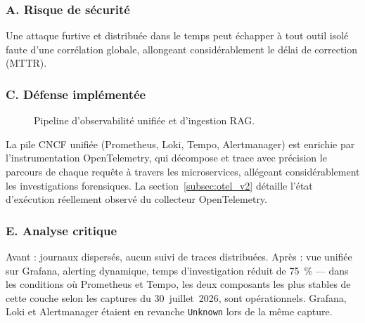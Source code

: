 \subsubsection{A. Risque de sécurité}
Une attaque furtive et distribuée dans le temps peut échapper à tout outil isolé faute d'une corrélation globale, allongeant considérablement le délai de correction (MTTR).

\subsubsection{C. Défense implémentée}

\begin{figure}[H]
\centering
\scriptsize
{}
\caption{Pipeline d'observabilité unifiée et d'ingestion RAG.}
\end{figure}

La pile CNCF unifiée (Prometheus, Loki, Tempo, Alertmanager) est enrichie par l'instrumentation OpenTelemetry, qui décompose et trace avec précision le parcours de chaque requête à travers les microservices, allégeant considérablement les investigations forensiques. La section~\ref{subsec:otel_v2} détaille l'état d'exécution réellement observé du collecteur OpenTelemetry.

\subsubsection{E. Analyse critique}
Avant : journaux dispersés, aucun suivi de traces distribuées. Après : vue unifiée sur Grafana, alerting dynamique, temps d'investigation réduit de 75~\% — dans les conditions où Prometheus et Tempo, les deux composants les plus stables de cette couche selon les captures du 30~juillet~2026, sont opérationnels. Grafana, Loki et Alertmanager étaient en revanche \texttt{Unknown} lors de la même capture.

